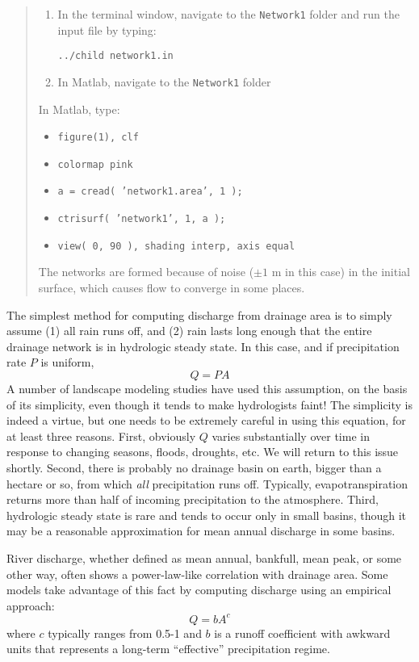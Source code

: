 \documentclass[12pt,reqno]{amsart}
\begin{document}
\begin{quote}
\small
{\sf
\begin{enumerate}
\item
In the terminal window, navigate to the {\tt Network1} folder and run the input file by typing:

{\tt ../child network1.in}
\item
In Matlab, navigate to the {\tt Network1} folder
\end{enumerate}

In Matlab, type:
\begin{itemize}
\setcounter{enumi}{2}
\item
{\tt figure(1), clf}
\item
{\tt colormap pink}
\item
{\tt a = cread( 'network1.area', 1 );}
\item
{\tt ctrisurf( 'network1', 1, a );}
\item
{\tt view( 0, 90 ), shading interp, axis equal}
\end{itemize}

The networks are formed because of noise ($\pm1$ m in this case) in the initial surface, which causes flow to converge in some places.
}
\end{quote}

The simplest method for computing discharge from drainage area is to simply assume (1) all rain runs off, and (2) rain lasts long enough that the entire drainage network is in hydrologic steady state. In this case, and if precipitation rate $P$ is uniform,
\begin{equation}
Q = PA
\end{equation}
A number of landscape modeling studies have used this assumption, on the basis of its simplicity, even though it tends to make hydrologists faint! The simplicity is indeed a virtue, but one needs to be extremely careful in using this equation, for at least three reasons. First, obviously $Q$ varies substantially over time in response to changing seasons, floods, droughts, etc. We will return to this issue shortly. Second, there is probably no drainage basin on earth, bigger than a hectare or so, from which {\em all} precipitation runs off. Typically, evapotranspiration returns more than half of incoming precipitation to the atmosphere. Third, hydrologic steady state is rare and tends to occur only in small basins, though it may be a reasonable approximation for mean annual discharge in some basins.

River discharge, whether defined as mean annual, bankfull, mean peak, or some other way, often shows a power-law-like correlation with drainage area. Some models take advantage of this fact by computing discharge using an empirical approach:
\begin{equation}
Q = b A^c
\end{equation}
where $c$ typically ranges from 0.5-1 and $b$ is a runoff coefficient with awkward units that represents a long-term ``effective'' precipitation regime.
\end{document}
